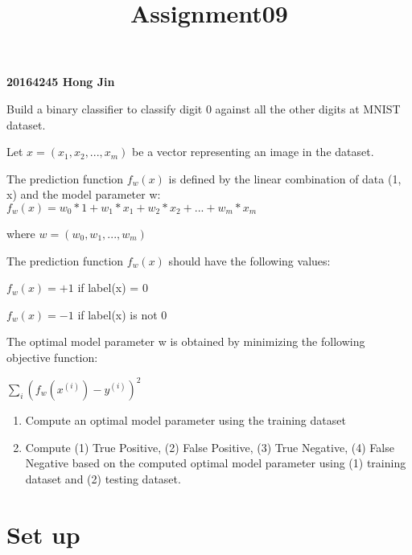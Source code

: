 \documentclass[11pt]{article}
\title{Assignment09}
\providecommand{\tightlist}{%
      \setlength{\itemsep}{0pt}\setlength{\parskip}{0pt}}
\begin{document}
    
    
    \maketitle
    
    

    
    \textbf{20164245 Hong Jin}

    Build a binary classifier to classify digit 0 against all the other
digits at MNIST dataset.

Let \(x = (x_1, x_2, ... , x_m)\) be a vector representing an image in
the dataset.

The prediction function \(f_w(x)\) is defined by the linear combination
of data (1, x) and the model parameter w:
\(f_w(x) = w_0 * 1 + w_1 * x_1 + w_2 * x_2 + ... + w_m * x_m\)

where \(w = (w_0, w_1, ... , w_m)\)

The prediction function \(f_w(x)\) should have the following values:

\(f_w(x) = +1\) if label(x) = 0

\(f_w(x) = -1\) if label(x) is not 0

The optimal model parameter w is obtained by minimizing the following
objective function:

\(\sum_i ( f_w(x^(i)) - y^(i) )^2\)

\begin{enumerate}
\def\labelenumi{\arabic{enumi}.}
\tightlist
\item
  Compute an optimal model parameter using the training dataset
\item
  Compute (1) True Positive, (2) False Positive, (3) True Negative, (4)
  False Negative based on the computed optimal model parameter using (1)
  training dataset and (2) testing dataset.
\end{enumerate}

    \section{Set up}\label{set-up}
\end{document}
